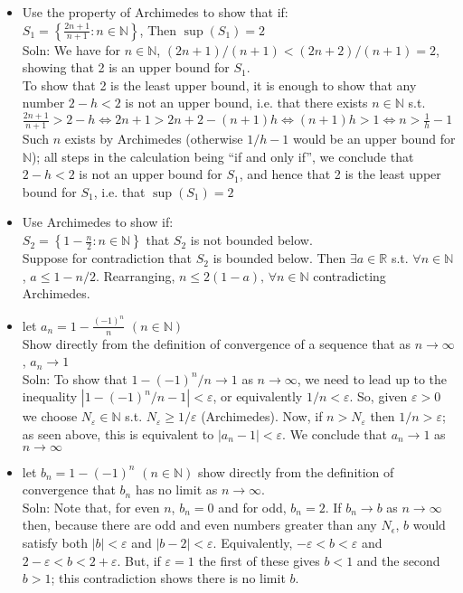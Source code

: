\documentclass[10pt]{article}
\begin{document}
\begin{multicols}{2}
\begin{itemize}
    \item Use the property of Archimedes to show that if:\\
    $S_{1}=\left\{\frac{2n+1}{n+1}:n\in\mathbb{N}\right\}$, Then $\sup(S_{1})=2$\\
    Soln: We have for $n\in\mathbb{N}$, $(2n+1)/(n+1)<(2n+2)/(n+1)=2$, showing that 2 is an upper bound for $S_{1}$.\\
    To show that 2 is the least upper bound, it is enough to show that any number $2-h<2$ is not an upper bound, i.e. that there exists $n\in\mathbb{N}$ s.t.\\
    $\frac{2n+1}{n+1}>2-h\iff2n+1>2n+2-(n+1)h\iff(n+1)h>1\iff n>\frac{1}{h}-1$\\
    Such $n$ exists by Archimedes (otherwise $1/h-1$ would be an upper bound for $\mathbb{N}$); all steps in the calculation being ``if and only if'', we conclude that $2-h<2$ is not an upper bound for $S_{1}$, and hence that 2 is the least upper bound for $S_{1}$, i.e. that $\sup(S_{1})=2$
    \item Use Archimedes to show if:\\
    $S_{2}=\left\{1-\frac{n}{2}:n\in\mathbb{N}\right\}$ that $S_{2}$ is not bounded below.\\
    Suppose for contradiction that $S_{2}$ is bounded below. Then $\exists a\in\mathbb{R}$ s.t. $\forall n\in\mathbb{N}$, $a\leq1-n/2$. Rearranging, $n\leq2(1-a),\,\forall n\in\mathbb{N}$ contradicting Archimedes.
    \item let $a_{n}=1-\frac{(-1)^{n}}{n}$ $(n\in\mathbb{N})$\\
    Show directly from the definition of convergence of a sequence that as $n\to\infty$, $a_{n}\to1$\\
    Soln: To show that $1-(-1)^{n}/n\to1$ as $n\to\infty$, we need to lead up to the inequality $|1-(-1)^{n}/n-1|<\varepsilon$, or equivalently $1/n<\varepsilon$. So, given $\varepsilon>0$ we choose $N_{\varepsilon}\in\mathbb{N}$ s.t. $N_{\varepsilon}\geq1/\varepsilon$ (Archimedes). Now, if $n>N_{\varepsilon}$ then $1/n>\varepsilon$; as seen above, this is equivalent to $|a_{n}-1|<\varepsilon$. We conclude that $a_{n}\to1$ as $n\to\infty$
    \item let $b_{n}=1-(-1)^{n}$ $(n\in\mathbb{N})$ show directly from the definition of convergence that $b_{n}$ has no limit as $n\to\infty$.\\
    Soln: Note that, for even $n$, $b_{n}=0$ and for odd, $b_{n}=2$. If $b_{n}\to b$ as $n\to\infty$ then, because there are odd and even numbers greater than any $N_{\epsilon}$, $b$ would satisfy both $|b|<\varepsilon$ and $|b-2|<\varepsilon$. Equivalently, $-\varepsilon<b<\varepsilon$ and $2-\varepsilon<b<2+\varepsilon$. But, if $\varepsilon=1$ the first of these gives $b<1$ and the second $b>1$; this contradiction shows there is no limit $b$.

\end{itemize}
\end{multicols}
\end{document}
